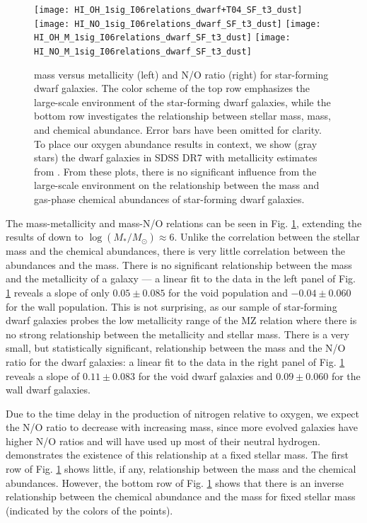 \begin{figure}
    \centering
    \texttt{[image: HI\_OH\_1sig\_I06relations\_dwarf+T04\_SF\_t3\_dust]}
    \texttt{[image: HI\_NO\_1sig\_I06relations\_dwarf\_SF\_t3\_dust]}
    \texttt{[image: HI\_OH\_M\_1sig\_I06relations\_dwarf\_SF\_t3\_dust]}
    \texttt{[image: HI\_NO\_M\_1sig\_I06relations\_dwarf\_SF\_t3\_dust]}
    \caption{ mass versus metallicity (left) and N/O ratio (right) for 
    star-forming dwarf galaxies.  The color scheme of the top row emphasizes the 
    large-scale environment of the star-forming dwarf galaxies, while the bottom 
    row investigates the relationship between stellar mass,  mass, and 
    chemical abundance.  Error bars have been omitted for clarity.  To place our 
    oxygen abundance results in context, we show (gray stars) the dwarf galaxies 
    in SDSS DR7 with metallicity estimates from \cite{Tremonti04}.  From these 
    plots, there is no significant influence from the large-scale environment on 
    the relationship between the  mass and gas-phase chemical 
    abundances of star-forming dwarf galaxies.}
    \label{fig:HI}
\end{figure}

The  mass-metallicity and  mass-N/O relations can be seen in 
Fig. \ref{fig:HI}, extending the results of \cite{Bothwell13} down to 
$\log(M_*/M_\odot) \approx 6$.  Unlike the correlation between the stellar mass 
and the chemical abundances, there is very little correlation between the 
abundances and the  mass.  There is no significant relationship 
between the  mass and the metallicity of a galaxy --- a linear fit to 
the data in the left panel of Fig. \ref{fig:HI} reveals a slope of only 
$0.05\pm 0.085$ for the void population and $-0.04\pm 0.060$ for the wall 
population.  This is not surprising, as our sample of star-forming dwarf 
galaxies probes the low metallicity range of the MZ relation where there is no 
strong relationship between the metallicity and stellar mass.  There is a very 
small, but statistically significant, relationship between the  mass 
and the N/O ratio for the dwarf galaxies: a linear fit to the data in the right 
panel of Fig. \ref{fig:HI} reveals a slope of $0.11\pm 0.083$ for the void dwarf 
galaxies and $0.09\pm 0.060$ for the wall dwarf galaxies.

Due to the time delay in the production of nitrogen relative to oxygen, we 
expect the N/O ratio to decrease with increasing  mass, since more 
evolved galaxies have higher N/O ratios and will have used up most of their 
neutral hydrogen.  \cite{Bothwell13} demonstrates the existence of this 
relationship at a fixed stellar mass.  The first row of Fig. \ref{fig:HI} shows 
little, if any, relationship between the  mass and the chemical 
abundances.  However, the bottom row of Fig. \ref{fig:HI} shows that there is an 
inverse relationship between the chemical abundance and the  mass for 
fixed stellar mass (indicated by the colors of the points).


